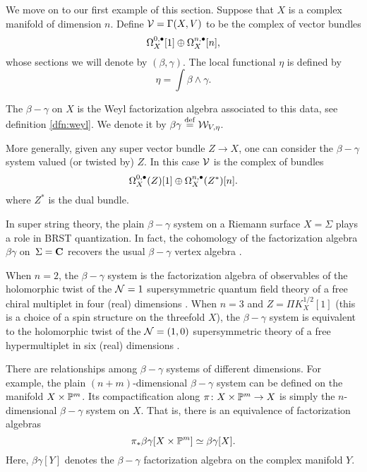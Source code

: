 \documentclass[11pt]{amsart}
\begin{document}
We move on to our first example of this section.
Suppose that $X$ is a complex manifold of dimension $n$.
Define $\mathcal V = \Gamma(X,V)$ to be the complex of vector bundles
\begin{equation}\label{eqn:bg}
\Omega^{0,\bullet}_{X} [1] \oplus \Omega^{n,\bullet}_{X} [n],
\end{equation}
whose sections we will denote by $(\beta,\gamma)$.
The local functional $\eta$ is defined by
\begin{equation}\label{eqn:etabg}
\eta = \int \beta \wedge \gamma .
\end{equation}

The $\beta-\gamma$  on $X$ is the Weyl factorization algebra associated to this data, see definition \ref{dfn:weyl}.
We denote it by $\beta\gamma \overset{\rm def}{=} \mathcal W_{V,\eta}$.

More generally, given any super vector bundle $Z \to X$, one can consider the $\beta-\gamma$ system valued (or twisted by) $Z$.
In this case $\mathcal V$ is the complex of bundles
\begin{equation}\label{eqn:bgZ}
\Omega^{0,\bullet}_{X}(Z) [1] \oplus \Omega^{n,\bullet}_{X}(Z^{*}) [n].
\end{equation}
where $Z^{*}$ is the dual bundle.

In super string theory, the plain $\beta-\gamma$ system on a Riemann surface $X = \Sigma$ plays a role in BRST quantization.
In fact, the cohomology of the factorization algebra $\beta\gamma$ on~$\Sigma=\mathbf{C}$ recovers the usual $\beta-\gamma$ vertex algebra \cite{CG1}.

When $n=2$, the $\beta-\gamma$ system is the factorization algebra of observables of the holomorphic twist of the $\mathcal N=1$ supersymmetric quantum field theory of a free chiral multiplet in four (real) dimensions \cite{CosYangian,ESW}.
When $n=3$ and $Z = \Pi K^{1/2}_{X}[1]$ (this is a choice of a spin structure on the threefold $X$), the $\beta-\gamma$ system is equivalent to the holomorphic twist of the $\mathcal N=(1,0)$ supersymmetric theory of a free hypermultiplet in six (real) dimensions \cite{ESW,SWtensor}.

There are relationships among $\beta-\gamma$ systems of different dimensions.
For example, the plain $(n+m)$-dimensional $\beta-\gamma$ system can be defined on the manifold $X \times \mathbb P^{m}$.
Its compactification along $\pi \colon X \times \mathbb P^{m} \to X$ is simply the $n$-dimensional $\beta-\gamma$ system on $X$.
That is, there is an equivalence of factorization algebras
\begin{equation}\label{eqn:bgcompact}
\pi_{*} \beta\gamma[X \times \mathbb P^{m}] \simeq \beta \gamma[X] .
\end{equation}
Here, $\beta\gamma[Y]$ denotes the $\beta-\gamma$ factorization algebra on the complex manifold $Y$.
\end{document}

